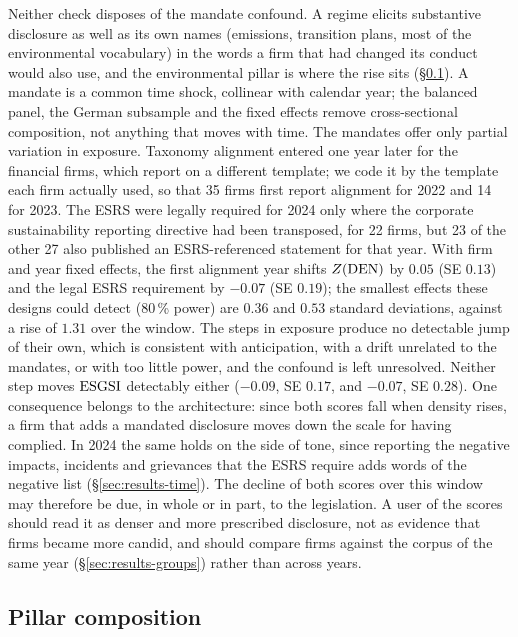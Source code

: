 Neither check disposes of the mandate confound. A regime elicits substantive disclosure as well as
its own names (emissions, transition plans, most of the environmental vocabulary) in the words a
firm that had changed its conduct would also use, and the environmental pillar is where the rise
sits (\S\ref{sec:results-pillars}). A mandate is a common time shock, collinear with calendar
year; the balanced panel, the German subsample and the fixed effects remove cross-sectional
composition, not anything that moves with time. The mandates offer only partial variation in
exposure. Taxonomy alignment entered one year later for the financial firms, which report on a
different template; we code it by the template each firm actually used, so that
35 firms first report alignment for 2022 and 14 for 2023. The ESRS
were legally required for 2024 only where the corporate sustainability reporting directive had
been transposed, for 22 firms, but 23 of the other 27 also
published an ESRS-referenced statement for that year. With firm and year fixed effects, the
first alignment year shifts $Z(\mathrm{DEN})$ by $0.05$ (SE $0.13$) and the legal ESRS requirement by
$-0.07$ (SE $0.19$); the smallest effects these designs could detect (80\,\% power) are
$0.36$ and $0.53$ standard deviations, against a rise of $1.31$ over the window.
The steps in exposure produce no detectable jump of their own, which is consistent with
anticipation, with a drift unrelated to the mandates, or with too little power, and the
confound is left unresolved. Neither step moves $\mathrm{ESGSI}$ detectably either ($-0.09$, SE $0.17$, and
$-0.07$, SE $0.28$). One consequence belongs to the architecture: since both scores fall when
density rises, a firm that adds a mandated disclosure moves down the scale for having complied.
In 2024 the same holds on the side of tone, since reporting the negative impacts, incidents and
grievances that the ESRS require adds words of the negative list
(\S\ref{sec:results-time}). The decline of both
scores over this window may therefore be due, in whole or in part, to the legislation. A user of
the scores should read it as denser and more prescribed disclosure, not as evidence that firms
became more candid, and should compare firms against the corpus of the same year
(\S\ref{sec:results-groups}) rather than across years.

\subsection{Pillar composition}
\label{sec:results-pillars}

